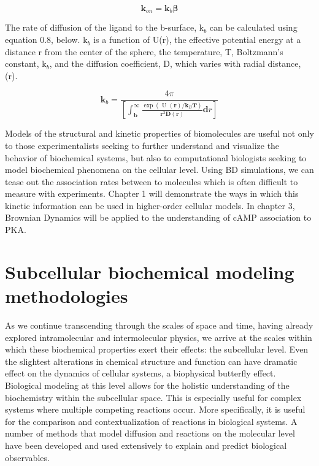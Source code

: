 \documentclass[12pt]{ucsddissertation}
\begin{document}
\begin{dissertationintroduction}
\begin{equation}
    \boldsymbol { k } _ { o n } = \boldsymbol { k } _ { b } \boldsymbol { \beta }
\end{equation}

The rate of diffusion of the ligand to the b-surface, k$_{b}$ can be calculated using equation 0.8, below. k$_{b}$ is a function of  U(r), the effective potential energy at a distance r from the center of the sphere, the temperature, T, Boltzmann's constant, k$_{b}$, and the diffusion coefficient, D, which varies with radial distance, (r).

\begin{equation}
    \boldsymbol { k } _ { b } = \frac{ 4 \pi} { \left[ \int _ { \mathbf { b } } ^ { \infty } \frac { \exp \left( \text { U } ( \boldsymbol { r } ) / \boldsymbol { k } _ { B } \boldsymbol { T } \right) } { \boldsymbol { r } ^ { 2 } \boldsymbol { D } ( \boldsymbol { r } ) } \boldsymbol { d } r \right] }
\end{equation}

Models of the structural and kinetic properties of biomolecules are useful not only to those experimentalists seeking to further understand and visualize the behavior of biochemical systems, but also to computational biologists seeking to model biochemical phenomena on the cellular level. Using BD simulations, we can tease out the association rates between to molecules which is often difficult to measure with experiments. Chapter 1 will demonstrate the ways in which this kinetic information can be used in higher-order cellular models. In chapter 3, Brownian Dynamics will be applied to the understanding of cAMP association to PKA.  

\section{Subcellular biochemical modeling methodologies}
As we continue transcending through the scales of space and time, having already explored intramolecular and intermolecular physics, we arrive at the scales within which these biochemical properties exert their effects: the subcellular level. Even the slightest alterations in chemical structure and function can have dramatic effect on the dynamics of cellular systems, a biophysical butterfly effect. Biological modeling at this level allows for the holistic understanding of the biochemistry within the subcellular space. This is especially useful for complex systems where multiple competing reactions occur. More specifically, it is useful for the comparison and contextualization of reactions in biological systems. A number of methods that model diffusion and reactions on the molecular level have been developed and used extensively to explain and predict biological observables. %



\end{dissertationintroduction}
\end{document}
